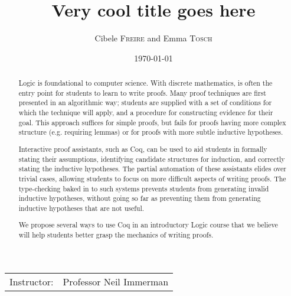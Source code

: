 \documentclass{article}
\title{Very cool title goes here} %
\author{Cibele \textsc{Freire} and Emma \textsc{Tosch}} %
\date{\today} %
\begin{document}
\lstset{language=Coq}
\maketitle %

\begin{center}
\begin{tabular}{l r}
Instructor: & Professor Neil Immerman %
\end{tabular}
\end{center}

\begin{abstract}
Logic is foundational to computer science. With discrete mathematics, is often the entry point for students to learn to write proofs. Many proof techniques are first presented in an algorithmic way; students are supplied with a set of conditions for which the technique will apply, and a procedure for constructing evidence for their goal. This approach suffices for simple proofs, but fails for proofs having more complex structure (e.g. requiring lemmas) or for proofs with more subtle inductive hypotheses.

Interactive proof assistants, such as Coq, can be used to aid students in formally stating their assumptions, identifying candidate structures for induction, and correctly stating the inductive hypotheses. The partial automation of these assistants elides over trivial cases, allowing students to focus on more difficult aspects of writing proofs. The type-checking baked in to such systems prevents students from generating invalid inductive hypotheses, without going so far as preventing them from generating inductive hypotheses that are not useful. 

We propose several ways to use Coq in an introductory Logic course that we believe will help students better grasp the mechanics of writing proofs.
 
\end{abstract}

\end{document}
